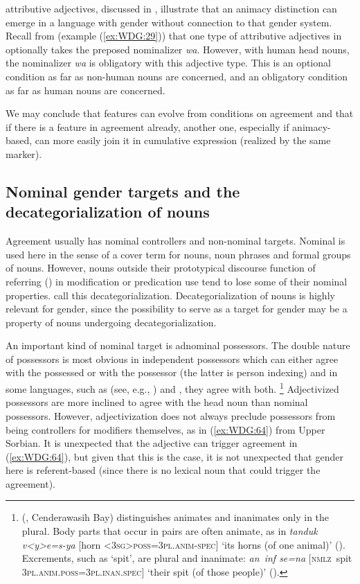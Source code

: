 \documentclass[output=collectionpaper]{langsci/langscibook}
\begin{document}
 attributive adjectives, discussed in , illustrate that an animacy distinction can emerge in a language with gender without connection to that gender system. Recall from  (example (\ref{ex:WDG:29})) that one type of attributive adjectives in  optionally takes the preposed nominalizer \textit{wa}. However, with human head nouns, the nominalizer \textit{wa} is obligatory with this adjective type. This is an optional condition as far as non-human nouns are concerned, and an obligatory condition as far as human nouns are concerned.

We may conclude that features can evolve from conditions on agreement and that if there is a feature in agreement already, another one, especially if animacy-based, can more easily join it in cumulative expression (realized by the same marker).

  \subsection{Nominal gender targets and the decategorialization of nouns}
\label{sec:WDG:7.6}

Agreement usually has nominal controllers and non-nominal targets. Nominal is used here in the sense of a cover term for nouns, noun phrases and formal groups of nouns. However, nouns outside their prototypical discourse function of referring (\citealt[87]{Croft2001}) in modification or predication use tend to lose some of their nominal properties. \cite[711]{Hopper1984} call this decategorialization. Decategorialization of nouns is highly relevant for gender, since the possibility to serve as a target for gender may be a property of nouns undergoing decategorialization.

An important kind of nominal target is adnominal possessors. The double nature of possessors is most obvious in independent possessors which can either agree with the possessed or with the possessor (the latter is person indexing) and in some languages, such as  (see, e.g., ) and , they agree with both.%
\footnote{%
 (, Cenderawasih Bay) distinguishes animates and inanimates only in the plural. Body parts that occur in pairs are often animate, as in \textit{tanduk v<y>e=s-ya} [horn \textsc{<3sg>poss=3pl.anim-spec}] `its horns (of one animal)' (\citealt[106]{Heuvel2006}). Excrements, such as `spit', are plural and inanimate: \textit{an~inf se=na} [\textsc{nmlz}~spit \textsc{3pl.anim.poss=3pl.inan.spec}] `their spit (of those people)' (\citealt[273]{Heuvel2006}).
} %
Adjectivized possessors are more inclined to agree with the head noun than nominal possessors. However, adjectivization does not always preclude possessors from being controllers for modifiers themselves, as in (\ref{ex:WDG:64}) from Upper Sorbian. It is unexpected that the  adjective can trigger agreement in (\ref{ex:WDG:64}), but given that this is the case, it is not unexpected that gender here is referent-based (since there is no lexical noun that could trigger the agreement).
\end{document}
